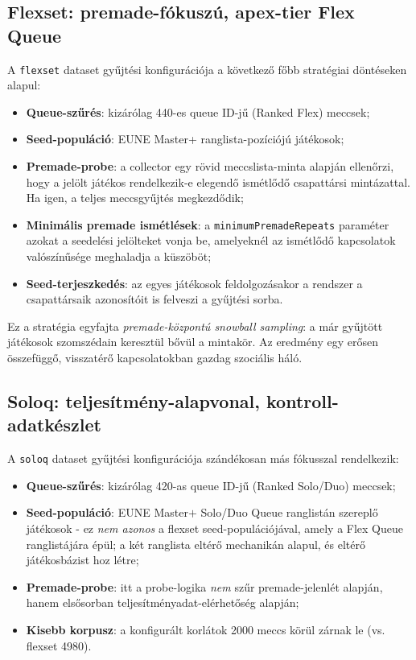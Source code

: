 ﻿\documentclass[a4paper,12pt]{report}
\begin{document}
\subsection{Flexset: premade-fókuszú, apex-tier Flex Queue}

A \texttt{flexset} dataset gyűjtési konfigurációja a következő főbb stratégiai döntéseken alapul:

\begin{itemize}
    \item \textbf{Queue-szűrés}: kizárólag 440-es queue ID-jű (Ranked Flex) meccsek;
    \item \textbf{Seed-populáció}: EUNE Master+ ranglista-pozíciójú játékosok;
    \item \textbf{Premade-probe}: a collector egy rövid meccslista-minta alapján ellenőrzi, hogy a jelölt játékos rendelkezik-e elegendő ismétlődő csapattársi mintázattal. Ha igen, a teljes meccsgyűjtés megkezdődik;
    \item \textbf{Minimális premade ismétlések}: a \texttt{minimumPremadeRepeats} paraméter azokat a seedelési jelölteket vonja be, amelyeknél az ismétlődő kapcsolatok valószínűsége meghaladja a küszöböt;
    \item \textbf{Seed-terjeszkedés}: az egyes játékosok feldolgozásakor a rendszer a csapattársaik azonosítóit is felveszi a gyűjtési sorba.
\end{itemize}

Ez a stratégia egyfajta \emph{premade-központú snowball sampling}: a már gyűjtött játékosok szomszédain keresztül bővül a mintakör. Az eredmény egy erősen összefüggő, visszatérő kapcsolatokban gazdag szociális háló.

\subsection{Soloq: teljesítmény-alapvonal, kontroll-adatkészlet}

A \texttt{soloq} dataset gyűjtési konfigurációja szándékosan más fókusszal rendelkezik:

\begin{itemize}
    \item \textbf{Queue-szűrés}: kizárólag 420-as queue ID-jű (Ranked Solo/Duo) meccsek;
    \item \textbf{Seed-populáció}: EUNE Master$+$ Solo/Duo Queue ranglistán szereplő játékosok - ez \emph{nem azonos} a flexset seed-populációjával, amely a Flex Queue ranglistájára épül; a két ranglista eltérő mechanikán alapul, és eltérő játékosbázist hoz létre;
    \item \textbf{Premade-probe}: itt a probe-logika \emph{nem} szűr premade-jelenlét alapján, hanem elsősorban teljesítményadat-elérhetőség alapján;
    \item \textbf{Kisebb korpusz}: a konfigurált korlátok 2000 meccs körül zárnak le (vs. flexset 4980).
\end{itemize}
\end{document}
